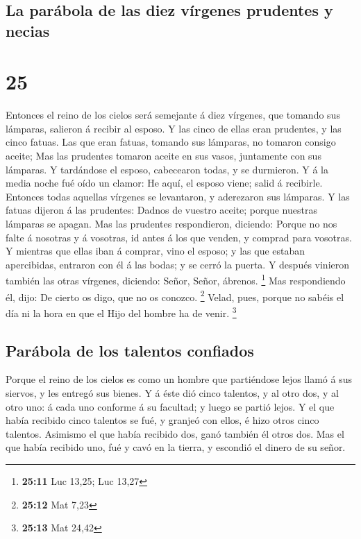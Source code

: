 \hypertarget{la-paruxe1bola-de-las-diez-vuxedrgenes-prudentes-y-necias}{%
\subsection{La parábola de las diez vírgenes prudentes y
necias}\label{la-paruxe1bola-de-las-diez-vuxedrgenes-prudentes-y-necias}}

\hypertarget{section-24}{%
\section{25}\label{section-24}}

 Entonces el reino de los cielos será semejante á diez
vírgenes, que tomando sus lámparas, salieron á recibir al esposo.
 Y las cinco de ellas eran prudentes, y las cinco fatuas.
 Las que eran fatuas, tomando sus lámparas, no tomaron
consigo aceite;  Mas las prudentes tomaron aceite en sus
vasos, juntamente con sus lámparas.  Y tardándose el
esposo, cabecearon todas, y se durmieron.  Y á la media
noche fué oído un clamor: He aquí, el esposo viene; salid á recibirle.
 Entonces todas aquellas vírgenes se levantaron, y
aderezaron sus lámparas.  Y las fatuas dijeron á las
prudentes: Dadnos de vuestro aceite; porque nuestras lámparas se apagan.
 Mas las prudentes respondieron, diciendo: Porque no nos
falte á nosotras y á vosotras, id antes á los que venden, y comprad para
vosotras.  Y mientras que ellas iban á comprar, vino el
esposo; y las que estaban apercibidas, entraron con él á las bodas; y se
cerró la puerta.  Y después vinieron también las otras
vírgenes, diciendo: Señor, Señor, ábrenos. \footnote{\textbf{25:11} Luc
  13,25; Luc 13,27}  Mas respondiendo él, dijo: De cierto
os digo, que no os conozco. \footnote{\textbf{25:12} Mat 7,23}
 Velad, pues, porque no sabéis el día ni la hora en que
el Hijo del hombre ha de venir. \footnote{\textbf{25:13} Mat 24,42}

\hypertarget{paruxe1bola-de-los-talentos-confiados}{%
\subsection{Parábola de los talentos
confiados}\label{paruxe1bola-de-los-talentos-confiados}}

 Porque el reino de los cielos es como un hombre que
partiéndose lejos llamó á sus siervos, y les entregó sus bienes.
 Y á éste dió cinco talentos, y al otro dos, y al otro
uno: á cada uno conforme á su facultad; y luego se partió lejos.
 Y el que había recibido cinco talentos se fué, y granjeó
con ellos, é hizo otros cinco talentos.  Asimismo el que
había recibido dos, ganó también él otros dos.  Mas el
que había recibido uno, fué y cavó en la tierra, y escondió el dinero de
su señor.

